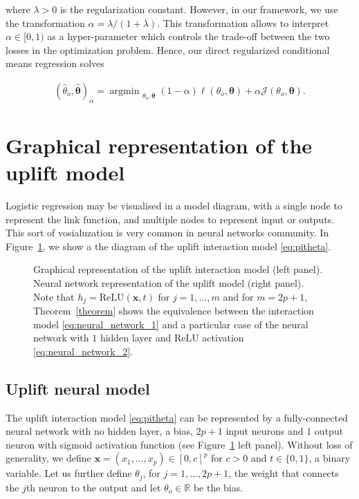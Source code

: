 \documentclass{article}
\def\x{\mathbf x}
\def\r{\mathbf r}
\def \r {\mathrm{ReLU}}
\def \vahid {\color{magenta}}
\DeclareMathOperator*{\argmin}{argmin~} %
\begin{document}
where $\lambda > 0$ is the regularization constant. However, in our framework, we use the transformation $\alpha = \lambda / (1+\lambda)$. This transformation allows to interpret $\alpha \in [0,1)$ as a hyper-parameter which controls the trade-off between the two losses in the optimization problem. Hence, our direct regularized conditional means regression solves

\begin{align}
    (\hat{\theta}_o,{\boldsymbol{\hat\theta}})_{\alpha} = \argmin_{\theta_o,\boldsymbol{\theta}} (1 - \alpha)  \ell(\theta_o,\boldsymbol{\theta}) + \alpha \mathcal{J}(\theta_o,\boldsymbol{\theta}).
    \label{eq:SMITE_objective}
\end{align}


\section{Graphical representation of the uplift model}
Logistic regression may be visualised in a model diagram, with a single node to represent the link function, and multiple nodes to represent input or outputs. This sort of vosialuzation is very common in neural networks community. In Figure~\ref{fig:int_as_nn}, we show a  the diagram  of the uplift interaction model \eqref{eq:pitheta}.

\begin{figure}[!ht]
    \centering
    
    \caption{Graphical representation of the uplift interaction model (left panel). Neural network representation of the uplift model (right panel). Note that $h_j = \r(\x,t)$ for $j=1,\ldots,m$ and for $m=2p+1$, Theorem~\ref{theorem} shows the equivalence between the interaction model \eqref{eq:neural_network_1} and a particular case of the neural network with $1$ hidden layer and $\r$ activation \eqref{eq:neural_network_2}. %
    }
    \label{fig:int_as_nn}
\end{figure}

\subsection{Uplift neural model}

The uplift interaction model \eqref{eq:pitheta}
can be represented by a fully-connected neural network with no hidden layer, a bias, $2p+1$ input neurons and $1$ output neuron with sigmoid activation function (see Figure~\ref{fig:int_as_nn} left panel). Without loss of generality, we define $\x = (x_1,...,x_p) \in [0,c]^{p}$ for $c>0$ and $t \in \{0,1\}$, a binary variable. Let us further define $\theta_{j}$, for $j=1,\ldots,2p+1$, the weight that connects the $j$th neuron to the output and let $\theta_o \in \mathbb{R}$ be the bias.
\end{document}
